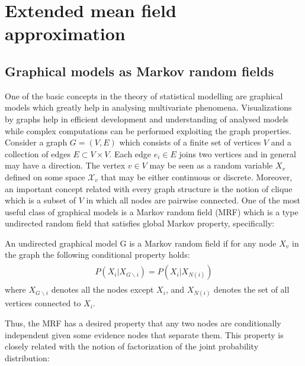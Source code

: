 
\chapter{Extended mean field approximation}

\section{Graphical models as Markov random fields}
One of the basic concepts in the theory of statistical modelling are graphical models which greatly help in analysing multivariate phenomena. Visualizations by graphs help in efficient development and understanding of analysed models while complex computations can be performed exploiting the graph properties. Consider a graph $G = (V,E)$ which consists of a finite set of vertices $V$ and a collection of edges $E \subset V \times V$. Each edge $e_i \in E$ joins two vertices and in general may have a direction. The vertex $v \in V$ may be seen as a random variable $X_v$ defined on some space $\mathcal{X}_v$ that may be either continuous or discrete. Moreover, an important concept related with every graph structure is the notion of clique which is a subset of $V$ in which all nodes are pairwise connected. One of the most useful class of graphical models is a Markov random field (MRF) which is a type undirected random field that satisfies global Markov property, specifically:
\begin{mydef} An undirected graphical model G is a Markov random field if for any node $X_v$ in the graph the following conditional property holds:
\begin{align*}
\begin{split}
P(X_i |X_{G\backslash i} ) = P(X_i | X_{N(i)})
\end{split}
\end{align*}
where $X_{G\backslash i}$ denotes all the nodes except $X_i$, and $X_{N(i)}$ denotes the set of all vertices connected to $X_i$.
\end{mydef}
Thus, the MRF has a desired property that any two nodes are conditionally independent given some evidence nodes that separate them. This property is closely related with the notion of factorization of the joint probability distribution:
